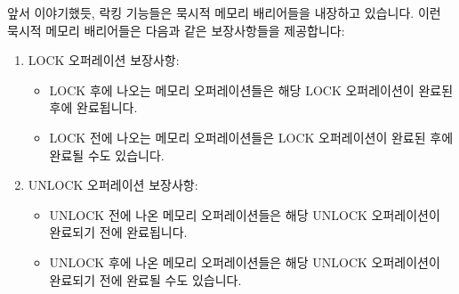 \begin{enumerate}
앞서 이야기했듯, 락킹 기능들은 묵시적 메모리 배리어들을 내장하고 있습니다.
이런 묵시적 메모리 배리어들은 다음과 같은 보장사항들을 제공합니다:
\begin{enumerate}
\item	LOCK 오퍼레이션 보장사항:
	\begin{itemize}
	\item	LOCK 후에 나오는 메모리 오퍼레이션들은 해당 LOCK 오퍼레이션이
		완료된 후에 완료됩니다.
	\item	LOCK 전에 나오는 메모리 오퍼레이션들은 LOCK 오퍼레이션이 완료된
		후에 완료될 수도 있습니다.
	\end{itemize}
\item	UNLOCK 오퍼레이션 보장사항:
	\begin{itemize}
	\item	UNLOCK 전에 나온 메모리 오퍼레이션들은 해당 UNLOCK 오퍼레이션이
		완료되기 전에 완료됩니다.
	\item	UNLOCK 후에 나온 메모리 오퍼레이션들은 해당 UNLOCK 오퍼레이션이
		완료되기 전에 완료될 수도 있습니다.
	\end{itemize}
\iffalse


\end{enumerate}
\end{enumerate}

